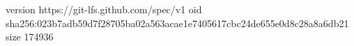 version https://git-lfs.github.com/spec/v1
oid sha256:023b7adb59d7f28705ba02a563acae1e7405617cbc24de655e0d8c28a8a6db21
size 174936
